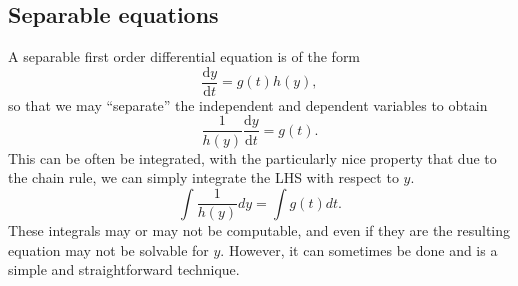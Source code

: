 \documentclass[12pt]{article}
\begin{document}
\subsection{Separable equations}

A separable first order differential equation is of the form
\[\frac{\mathrm{d}y}{\mathrm{d}t} = g(t)h(y),\] so that we may ``separate'' the independent and dependent variables to obtain
\[\frac{1}{h(y)}\frac{\mathrm{d}y}{\mathrm{d}t} = g(t).\] This can be often be integrated, with the particularly nice property that due to the chain rule, we can simply integrate the LHS with respect to $y$.
\[\int \frac{1}{h(y)}dy = \int g(t)dt.\] These integrals may or may not be computable, and even if they are the resulting equation may not be solvable for $y$. However, it can sometimes be done and is a simple and straightforward technique.
\end{document}
